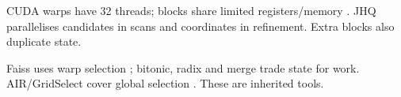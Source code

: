CUDA warps have 32 threads; blocks share limited registers/memory \cite{cuda_programming_guide}. JHQ parallelises candidates in scans and coordinates in refinement. Extra blocks also duplicate state.

Faiss uses warp selection \cite{johnson_gpu}; bitonic, radix and merge trade state for work. AIR/GridSelect cover global selection \cite{gpu_topk}. These are inherited tools.


